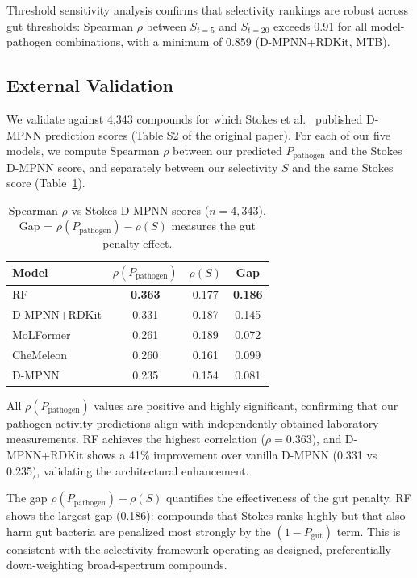 \documentclass{article}
\newcommand{\pp}{P_{\mathrm{pathogen}}}
\newcommand{\pg}{P_{\mathrm{gut}}}
\begin{document}
Threshold sensitivity analysis confirms that selectivity rankings are robust across gut thresholds: Spearman $\rho$ between $S_{t{=}5}$ and $S_{t{=}20}$ exceeds 0.91 for all model-pathogen combinations, with a minimum of 0.859 (D-MPNN+RDKit, MTB).

\subsection{External Validation}
\label{sec:external}

We validate against 4,343 compounds for which Stokes et al.~\citep{stokes2020} published D-MPNN prediction scores (Table S2 of the original paper).
For each of our five models, we compute Spearman $\rho$ between our predicted $\pp$ and the Stokes D-MPNN score, and separately between our selectivity $S$ and the same Stokes score (Table~\ref{tab:stokes}).

\begin{table}[t]
\caption{Spearman $\rho$ vs Stokes D-MPNN scores ($n{=}4{,}343$). Gap = $\rho(\pp) - \rho(S)$ measures the gut penalty effect.}
\label{tab:stokes}
\vskip 0.1in
\centering
\scriptsize
\begin{tabular}{lccc}
\toprule
\textbf{Model} & $\rho(\pp)$ & $\rho(S)$ & \textbf{Gap} \\
\midrule
RF              & \textbf{0.363} & 0.177 & \textbf{0.186} \\
D-MPNN+RDKit    & 0.331 & 0.187 & 0.145 \\
MoLFormer       & 0.261 & 0.189 & 0.072 \\
CheMeleon       & 0.260 & 0.161 & 0.099 \\
D-MPNN          & 0.235 & 0.154 & 0.081 \\
\bottomrule
\end{tabular}
\end{table}

All $\rho(\pp)$ values are positive and highly significant, confirming that our pathogen activity predictions align with independently obtained laboratory measurements.
RF achieves the highest correlation ($\rho = 0.363$), and D-MPNN+RDKit shows a 41\% improvement over vanilla D-MPNN (0.331 vs 0.235), validating the architectural enhancement.

The gap $\rho(\pp) - \rho(S)$ quantifies the effectiveness of the gut penalty.
RF shows the largest gap (0.186): compounds that Stokes ranks highly but that also harm gut bacteria are penalized most strongly by the $(1 - \pg)$ term.
This is consistent with the selectivity framework operating as designed, preferentially down-weighting broad-spectrum compounds.
\end{document}
